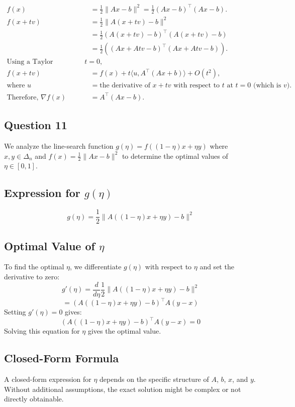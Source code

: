 \documentclass[12p]{article}
\begin{document}
\begin{align*}
f(x) &= \frac{1}{2} \|Ax - b\|^2 = \frac{1}{2} (Ax - b)^\top (Ax - b). \\
f(x + tv) &= \frac{1}{2} \|A(x + tv) - b\|^2 \\
&= \frac{1}{2} (A(x + tv) - b)^\top (A(x + tv) - b) \\
&= \frac{1}{2} ((Ax + Atv - b)^\top (Ax + Atv - b)). \\
\text{Using a Taylor expansion around } t = 0, \\
f(x + tv) &= f(x) + t \langle u, A^\top (Ax + b) \rangle + O(t^2), \\
\text{where } u &= \text{the derivative of } x + tv \text{ with respect to } t \text{ at } t = 0 \text{ (which is } v \text{)}. \\
\text{Therefore, } \nabla f(x) &= A^\top (Ax - b).
\end{align*}



\subsection*{Question 11} 

We analyze the line-search function \( g(\eta) = f((1 - \eta)x + \eta y) \) where \( x, y \in \Delta_n \) and \( f(x) = \frac{1}{2}\|Ax - b\|^2 \) to determine the optimal values of \( \eta \in [0, 1] \).

\subsection*{Expression for \( g(\eta) \)}
\[ g(\eta) = \frac{1}{2} \|A((1 - \eta)x + \eta y) - b\|^2 \]

\subsection*{Optimal Value of \( \eta \)}
To find the optimal \(\eta\), we differentiate \(g(\eta)\) with respect to \(\eta\) and set the derivative to zero:
\[ g'(\eta) = \frac{d}{d\eta} \frac{1}{2} \|A((1 - \eta)x + \eta y) - b\|^2 \]
\[ = (A((1 - \eta)x + \eta y) - b)^\top A(y - x) \]
Setting \( g'(\eta) = 0 \) gives:
\[ (A((1 - \eta)x + \eta y) - b)^\top A(y - x) = 0 \]
Solving this equation for \(\eta\) gives the optimal value.

\subsection*{Closed-Form Formula}
A closed-form expression for \(\eta\) depends on the specific structure of \(A\), \(b\), \(x\), and \(y\). Without additional assumptions, the exact solution might be complex or not directly obtainable.
\end{document}

